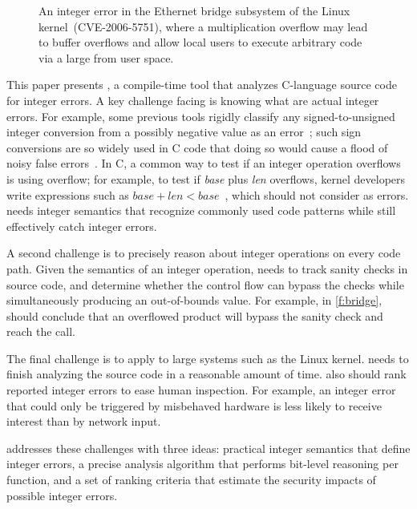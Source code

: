 \begin{figure}[t]
\centering

\vspace{-1em}
\caption{An integer error in the Ethernet bridge subsystem of the
Linux kernel~(CVE-2006-5751), where a multiplication overflow
may lead to buffer overflows and allow local users to execute
arbitrary code via a large  from user space.
}
\label{f:bridge}
\end{figure}

This paper presents \sys, a compile-time tool that analyzes C-language
source code for integer errors.
%
A key challenge facing \sys is knowing what are actual integer errors.  For
example, some previous tools rigidly classify any signed-to-unsigned integer
conversion from a possibly negative value as an error~\cite{brumley:rich,
  moy:z3prefix, seacord:secure-c}; such sign conversions are so widely used in C
code that doing so would cause a flood of noisy false
errors~\cite[\subsectionautorefname~6.2]{moy:z3prefix}.  In C, a common way to
test if an integer operation overflows is using overflow; for example, to test
if \textit{base} plus \textit{len} overflows, kernel developers write
expressions such as $\mathit{base} + \mathit{len} < \mathit{base}$~\cite{ioc},
which \sys should not consider as
errors.  \sys needs integer semantics that recognize commonly used code patterns
while still effectively catch integer errors.

A second challenge is to precisely reason about integer operations
on every code path.  Given the semantics of an integer operation,
\sys needs to track sanity checks in source code, and determine
whether the control flow can bypass the checks while simultaneously
producing an out-of-bounds value.  For example, in \autoref{f:bridge},
\sys should conclude that an overflowed product  will
bypass the sanity check and reach the  call.

The final challenge is to apply \sys to large systems such as the
Linux kernel.  \sys needs to finish analyzing the source code in a
reasonable amount of time.  \sys also should rank reported integer
errors to ease human inspection.  For example, an integer error
that could only be triggered by misbehaved hardware is
less likely to receive interest than by network input.

\sys addresses these challenges with three ideas: practical integer
semantics that define integer errors, a precise analysis algorithm
that performs bit-level reasoning per function, and a set of ranking
criteria that estimate the security impacts of possible integer
errors.

